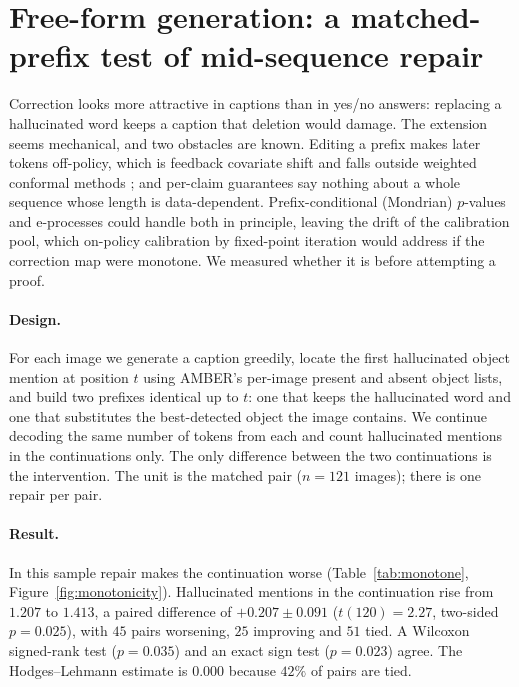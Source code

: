 \section{Free-form generation: a matched-prefix test of mid-sequence repair}
\label{sec:sequential}

Correction looks more attractive in captions than in yes/no answers: replacing a hallucinated word keeps a
caption that deletion would damage. The extension seems mechanical, and two obstacles are known. Editing a prefix makes
later tokens off-policy, which is feedback covariate shift \citep{fannjiang2022fcs} and falls outside weighted conformal
methods \citep{tibshirani2019}; and per-claim guarantees say nothing about a whole sequence whose length is
data-dependent. Prefix-conditional (Mondrian) $p$-values and e-processes \citep{waudbysmith2024,ramdas2023} could
handle both in principle, leaving the drift of the calibration pool, which on-policy calibration by fixed-point
iteration would address if the correction map were monotone. We measured whether it is before attempting a proof.

\paragraph{Design.}
For each image we generate a caption greedily, locate the first hallucinated object mention at position $t$ using AMBER's
per-image present and absent object lists, and build two prefixes identical up to $t$: one that keeps the hallucinated
word and one that substitutes the best-detected object the image contains. We continue decoding the same number of
tokens from each and count hallucinated mentions in the continuations only. The only difference between the two
continuations is the intervention. The unit is the matched pair ($n=121$ images); there is one repair per pair.

\paragraph{Result.}
In this sample repair makes the continuation worse (Table~\ref{tab:monotone}, Figure~\ref{fig:monotonicity}). Hallucinated mentions
in the continuation rise from $1.207$ to $1.413$, a paired difference of $+0.207\pm0.091$ ($t(120)=2.27$, two-sided
$p=0.025$), with $45$ pairs worsening, $25$ improving and $51$ tied. A Wilcoxon signed-rank test ($p=0.035$) and an exact sign test
($p=0.023$) agree. The Hodges--Lehmann estimate is $0.000$ because $42\%$ of pairs are tied.

